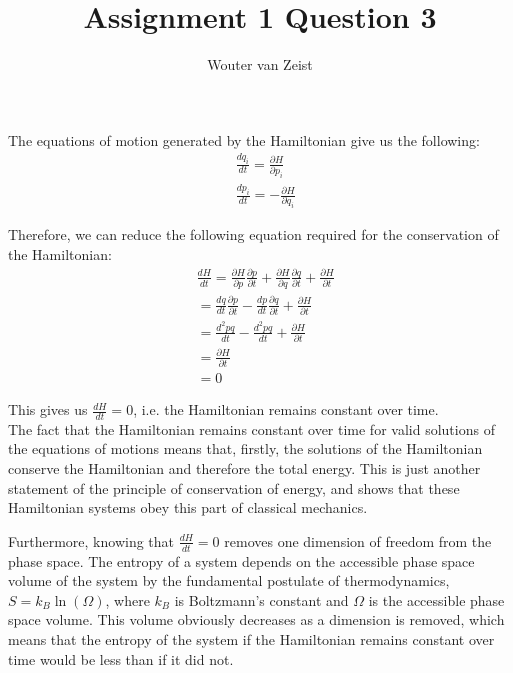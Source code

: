\documentclass{article}
\title{Assignment 1 Question 3}
\author{Wouter van Zeist}
\date{}
\begin{document}
	\maketitle

The equations of motion generated by the Hamiltonian give us the following:
\begin{align*}
&\frac{dq_{i}}{dt}=\frac{\partial H}{\partial p_{i}}\\
&\frac{dp_{i}}{dt}=-\frac{\partial H}{\partial q_{i}}
\end{align*}

Therefore, we can reduce the following equation required for the conservation of the Hamiltonian:
\begin{align*}
&\frac{dH}{dt}=\frac{\partial H}{\partial p}\frac{\partial p}{\partial t}+\frac{\partial H}{\partial q}\frac{\partial q}{\partial t}+\frac{\partial H}{\partial t}\\
&=\frac{dq}{dt}\frac{\partial p}{\partial t}-\frac{dp}{dt}\frac{\partial q}{\partial t}+\frac{\partial H}{\partial t}\\
&=\frac{d^{2}pq}{dt}-\frac{d^{2}pq}{dt}+\frac{\partial H}{\partial t}\\
&=\frac{\partial H}{\partial t}\\
&=0
\end{align*}

This gives us $\frac{dH}{dt}=0$, i.e. the Hamiltonian remains constant over time.\\

The fact that the Hamiltonian remains constant over time for valid solutions of the equations of motions means that, firstly, the solutions of the Hamiltonian conserve the Hamiltonian and therefore the total energy. This is just another statement of the principle of conservation of energy, and shows that these Hamiltonian systems obey this part of classical mechanics.

Furthermore, knowing that $\frac{dH}{dt}=0$ removes one dimension of freedom from the phase space. The entropy of a system depends on the accessible phase space volume of the system by the fundamental postulate of thermodynamics, $S=k_{B}\ln(\Omega)$, where $k_{B}$ is Boltzmann's constant and $\Omega$ is the accessible phase space volume. This volume obviously decreases as a dimension is removed, which means that the entropy of the system if the Hamiltonian remains constant over time would be less than if it did not.
\end{document}
